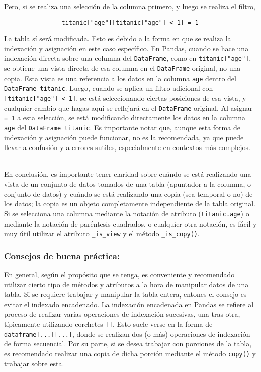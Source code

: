             \noindent Pero, si se realiza una selección de la columna primero, y luego se realiza el filtro,
            \begin{verbatim}
                titanic["age"][titanic["age"] < 1] = 1
            \end{verbatim}

            La tabla sí será modificada. Esto es debido a la forma en que se realiza la indexación y asignación en este caso específico. En Pandas, cuando se hace una indexación directa sobre una columna del \texttt{DataFrame}, como en \texttt{titanic["age"]}, se obtiene una vista directa de esa columna en el \texttt{DataFrame} original, no una copia. Esta vista es una referencia a los datos en la columna \texttt{age} dentro del \texttt{DataFrame titanic}. Luego, cuando se aplica un filtro adicional con \texttt{[titanic["age"] < 1]}, se está seleccionando ciertas posiciones de esa vista, y cualquier cambio que hagas aquí se reflejará en el \texttt{DataFrame} original. Al asignar \texttt{= 1} a esta selección, se está modificando directamente los datos en la columna \texttt{age} del \texttt{DataFrame titanic}. Es importante notar que, aunque esta forma de indexación y asignación puede funcionar, no es la recomendada, ya que puede llevar a confusión y a errores sutiles, especialmente en contextos más complejos. \\\

            \noindent En conclusión, es importante tener claridad sobre cuándo se está realizando una vista de un conjunto de datos tomados de una tabla (apuntador a la columna, o conjunto de datos) y cuándo se está realizando una copia (sea temporal o no) de los datos; la copia es un objeto completamente independiente de la tabla original. Si se selecciona una columna mediante la notación de atributo (\texttt{titanic.age}) o mediante la notación de paréntesis cuadrados, o cualquier otra notación, es fácil y muy útil utilizar el atributo \texttt{\_is\_view} y el método \texttt{\_is\_copy()}.

            \subsubsection{Consejos de buena práctica:} 
                En general, según el propósito que se tenga, es conveniente y recomendado utilizar cierto tipo de métodos y atributos a la hora de manipular datos de una tabla.
                Si se requiere trabajar y manipular la tabla entera, entones el consejo es evitar el indexado encadenado. La indexación encadenada en Pandas se refiere al proceso de realizar varias operaciones de indexación sucesivas, una tras otra, típicamente utilizando corchetes \texttt{[]}. Esto suele verse en la forma de \texttt{dataframe[...][...]}, donde se realizan dos (o más) operaciones de indexación de forma secuencial. Por su parte, si se desea trabajar con porciones de la tabla, es recomendado realizar una copia de dicha porción mediante el método \texttt{copy()} y trabajar sobre esta.


